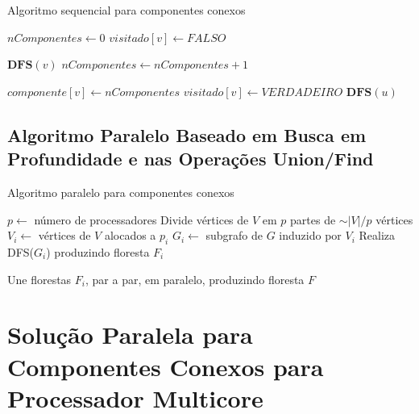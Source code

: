\documentclass[12pt]{article}
\begin{document}
\begin{algorithm}[h]
    \DontPrintSemicolon
    \caption{Algoritmo sequencial para componentes conexos}
	{
        $nComponentes \gets 0$\;
        {
            $visitado[v] \gets FALSO$\;
        }
    
        {
            {
                $\textbf{DFS}(v)$\;
                $nComponentes \gets nComponentes + 1$\;
            }
        }
    }
    
    {
        $componente[v] \gets nComponentes$\; 
        $visitado[v] \gets VERDADEIRO$\;
        {
            {
                $\textbf{DFS}(u)$\;
            }
        }
    }
\end{algorithm}

\subsection{Algoritmo Paralelo Baseado em Busca em Profundidade e nas Operações Union/Find}

{\color{gray}\lipsum[1]}

\begin{algorithm}[h]
    \DontPrintSemicolon
    \caption{Algoritmo paralelo para componentes conexos}
    {
        $p \gets$ número de processadores\;
        Divide vértices de $V$ em $p$ partes de $\sim|V|/p$ vértices\;
        {
            $V_i \gets$ vértices de $V$ alocados a $p_i$\;
            $G_i \gets$ subgrafo de $G$ induzido por $V_i$\;
            Realiza DFS($G_i$) produzindo floresta $F_i$\;
        }

        Une florestas $F_i$, par a par, em paralelo, produzindo floresta $F$\;
        
    }
\end{algorithm}

\section{Solução Paralela para Componentes Conexos para Processador Multicore}
\end{document}

